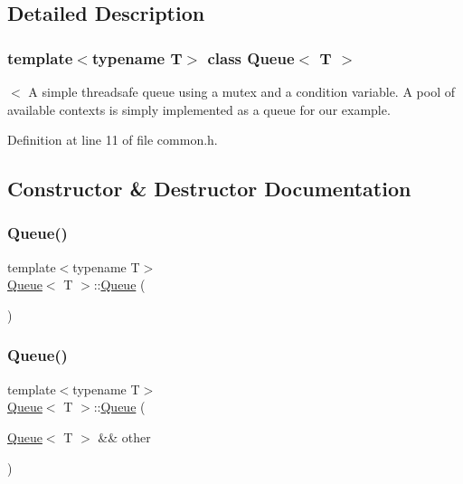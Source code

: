 \subsection{Detailed Description}
\subsubsection*{template$<$typename T$>$\newline
class Queue$<$ T $>$}

$<$ A simple threadsafe queue using a mutex and a condition variable. A pool of available contexts is simply implemented as a queue for our example. 

Definition at line 11 of file common.\+h.



\subsection{Constructor \& Destructor Documentation}
\mbox{\label{class_queue_ae6722c0f5afecd83719909a24f4902eb}} 
\subsubsection{\texorpdfstring{Queue()}{Queue()}\hspace{0.1cm}{\footnotesize\ttfamily [1/2]}}
{\footnotesize\ttfamily template$<$typename T$>$ \\
\mbox{\hyperlink{class_queue}{Queue}}$<$ T $>$\+::\mbox{\hyperlink{class_queue}{Queue}} (\begin{DoxyParamCaption}{ }\end{DoxyParamCaption})\hspace{0.3cm}{\ttfamily [default]}}

\mbox{\label{class_queue_ae486d20f8e29eefa34cf955904a44110}} 
\subsubsection{\texorpdfstring{Queue()}{Queue()}\hspace{0.1cm}{\footnotesize\ttfamily [2/2]}}
{\footnotesize\ttfamily template$<$typename T$>$ \\
\mbox{\hyperlink{class_queue}{Queue}}$<$ T $>$\+::\mbox{\hyperlink{class_queue}{Queue}} (\begin{DoxyParamCaption}\item[{\mbox{\hyperlink{class_queue}{Queue}}$<$ T $>$ \&\&}]{other }\end{DoxyParamCaption})\hspace{0.3cm}{\ttfamily [inline]}}



